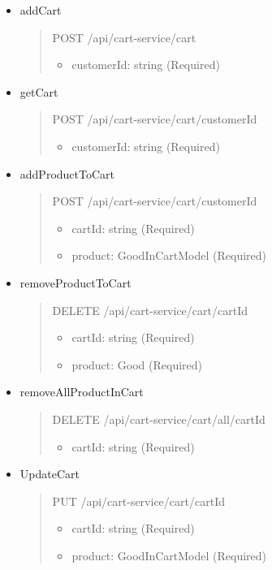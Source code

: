 \begin{itemize}
	\item addCart
	      \begin{quote}
		      POST /api/cart-service/cart
		      \begin{itemize}
			      \item customerId: string (Required)
		      \end{itemize}
	      \end{quote}

	\item getCart
	      \begin{quote}
		      POST /api/cart-service/cart/{customerId}
		      \begin{itemize}
			      \item customerId: string (Required)
		      \end{itemize}
	      \end{quote}

	\item addProductToCart
	      \begin{quote}
		      POST /api/cart-service/cart/{customerId}
		      \begin{itemize}
			      \item cartId: string (Required)
			      \item product: GoodInCartModel (Required)
		      \end{itemize}
	      \end{quote}

	\item removeProductToCart
	      \begin{quote}
		      DELETE /api/cart-service/cart/{cartId}
		      \begin{itemize}
			      \item cartId: string (Required)
			      \item product: Good (Required)
		      \end{itemize}
	      \end{quote}

	\item removeAllProductInCart
	      \begin{quote}
		      DELETE /api/cart-service/cart/all/{cartId}
		      \begin{itemize}
			      \item cartId: string (Required)
		      \end{itemize}
	      \end{quote}

	\item UpdateCart
	      \begin{quote}
		      PUT /api/cart-service/cart/{cartId}
		      \begin{itemize}
			      \item cartId: string (Required)
			      \item product: GoodInCartModel (Required)
		      \end{itemize}
	      \end{quote}
\end{itemize}

